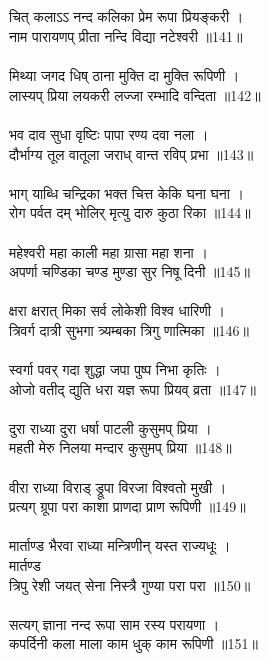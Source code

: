 \subsection{}
चित् कलाऽऽ नन्द कलिका प्रेम रूपा प्रियङ्करी ।\\
नाम पारायणप् प्रीता नन्दि विद्या नटेश्वरी ॥141॥\\
\\
मिथ्या जगद धिष् ठाना मुक्ति दा मुक्ति रूपिणी ।\\
लास्यप् प्रिया लयकरी लज्जा रम्भादि वन्दिता ॥142॥\\
\\
भव दाव सुधा वृष्टिः पापा रण्य दवा नला ।\\
दौर्भाग्य तूल वातूला जराध् वान्त रविप् प्रभा ॥143॥\\
\\
भाग् याब्धि चन्द्रिका भक्त चित्त केकि घना घना ।\\
रोग पर्वत दम् भोलिर् मृत्यु दारु कुठा रिका ॥144॥\\
\\
महेश्वरी महा काली महा ग्रासा महा शना ।\\
अपर्णा चण्डिका चण्ड मुण्डा सुर निषू दिनी ॥145॥\\
\\
क्षरा क्षरात् मिका सर्व लोकेशी विश्व धारिणी ।\\
त्रिवर्ग दात्री सुभगा त्र्यम्बका त्रिगु णात्मिका ॥146॥\\
\\
स्वर्गा पवर् गदा शुद्धा जपा पुष्प निभा कृतिः ।\\
ओजो वतीद् द्युति धरा यज्ञ रूपा प्रियव् व्रता ॥147॥\\
\\
दुरा राध्या दुरा धर्षा पाटली कुसुमप् प्रिया ।\\
महती मेरु निलया मन्दार कुसुमप् प्रिया ॥148॥\\
\\
वीरा राध्या विराड् ड्रूपा विरजा विश्वतो मुखी ।\\
प्रत्यग् ग्रूपा परा काशा प्राणदा प्राण रूपिणी ॥149॥\\
\\
मार्ताण्ड भैरवा राध्या मन्त्रिणीन् यस्त राज्यधूः । \\
{\small{} मार्तण्ड}\\
त्रिपु रेशी जयत् सेना निस्त्रै गुण्या परा परा ॥150॥\\
\\
सत्यग् ज्ञाना नन्द रूपा साम रस्य परायणा ।\\
कपर्दिनी कला माला काम धुक् काम रूपिणी ॥151॥\\
